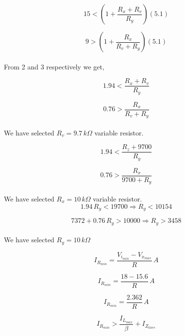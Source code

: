 \documentclass[12pt, a4paper]{article}
\begin{document}
\begin{equation}
15 < \left(1+\frac{R_x + R_v}{R_y}\right)(5.1)
\end{equation}

\begin{equation}
9 > \left(1+\frac{R_x}{R_v + R_y}\right)(5.1)
\end{equation}
\\
From 2 and 3 respectively we get,

\begin{equation*}
1.94 < \frac{R_x + R_v}{R_y}
\end{equation*}

\begin{equation*}
0.76 > \frac{R_x}{R_v + R_y}
\end{equation*}
\\
We have selected $R_v = 9.7\,k\Omega$ variable resistor.

\begin{equation}
1.94<\frac{R_z +9700}{R_y}    
\end{equation}

\begin{equation}
0.76>\frac{R_x}{9700+R_y}    
\end{equation}
\\
We have selected $ R_x = 10\,k\Omega$ variable resistor.
\begin{equation*}
1.94\,R_y < 19700 \Rightarrow R_y < 10154
\end{equation*}

\begin{equation*}
7372 + 0.76\,R_y > 10000 \Rightarrow R_y > 3458
\end{equation*}
\\
We have selected $ R_y = 10\,k\Omega$

\begin{equation}
I_{R_{min}} = \frac{V_{i_{min}} - V_{x_{max}}}{R}\,A
\end{equation}

\begin{equation*}
I_{R_{min}} = \frac{18 - 15.6}{R}\,A
\end{equation*}

\begin{equation*}
I_{R_{min}} = \frac{2.362}{R}\,A
\end{equation*}

\begin{equation}
I_{R_{min}} > \frac{I_{L_{max}}}{\beta} + I_{Z_{knee}}
\end{equation}
\end{document}
